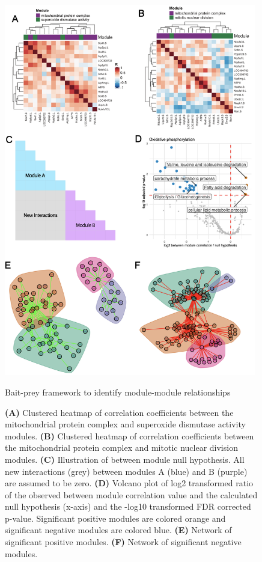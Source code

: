 \begin{figure}[hbt!]
\centering
\includegraphics[width=11cm, keepaspectratio]{figs/paper2/fig5.png}
\caption{Bait-prey framework to identify module-module relationships}
\caption*{\textbf{(A)} Clustered heatmap of correlation coefficients between the mitochondrial protein complex and superoxide dismutase activity modules. \textbf{(B)} Clustered heatmap of correlation coefficients between the mitochondrial protein complex and mitotic nuclear division modules. \textbf{(C)} Illustration of between module null hypothesis. All new interactions (grey) between modules A (blue) and B (purple) are assumed to be zero. \textbf{(D)} Volcano plot of log2 transformed ratio of the observed between module correlation value and the calculated null hypothesis (x-axis) and the -log10 transformed FDR corrected p-value. Significant positive modules are colored orange and significant negative modules are colored blue. \textbf{(E)} Network of significant positive modules. \textbf{(F)} Network of significant negative modules.}
\label{fig:paper2_fig5}
\end{figure}


